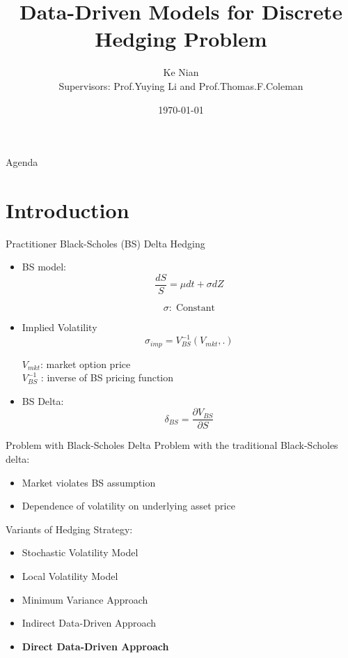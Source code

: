 \documentclass[10pt,table,mathserif]{beamer}
\title[Data-Driven Models for Discrete
Hedging Problem ]%
{Data-Driven Models for   Discrete
Hedging Problem}
\author[Ke Nian ] %
{ Ke Nian\\
 Supervisors: Prof.Yuying Li and Prof.Thomas.F.Coleman
}
\institute[
  David R. Cheriton School of Computer Science, University of Waterloo
] %
{%
  David R. Cheriton School of Computer Science,\\
  University of Waterloo,\\
  Waterloo, Canada
}
\date{\today}
\begin{document}
\begin{frame}[plain] %
  \titlepage
\end{frame}

\begin{frame}{Agenda}{}
\tableofcontents
\end{frame}

\section{Introduction}


\begin{frame}{Practitioner Black-Scholes (BS) Delta Hedging}

\begin{itemize}
  \item BS model:
\[
\frac{d S}{ S}= \mu dt +\sigma dZ
\]

\[
\sigma:\; \text{Constant}
\]
\item Implied Volatility
  \[
  \sigma_{imp}=V_{BS}^{-1}(V_{mkt},.)
  \]
  \begin{center}
  $V_{mkt}$: market option price \\ $V_{BS}^{-1}$ : inverse of BS pricing function
  \end{center}

\item BS Delta:
\[
\delta_{BS}=\frac{\partial V_{BS}}{ \partial S}
\]
\end{itemize}

\end{frame}






\begin{frame}{Problem with Black-Scholes Delta}
Problem with the traditional Black-Scholes delta:
\begin{itemize}
  \item Market violates BS assumption
  \item Dependence of volatility on underlying asset price
\end{itemize}
Variants of Hedging Strategy:
\begin{itemize}
  \item Stochastic Volatility Model
  \item Local Volatility Model
  \item Minimum Variance Approach
  \item Indirect Data-Driven Approach
  \item \textbf{Direct Data-Driven Approach}
\end{itemize}
\end{frame}
\end{document}
